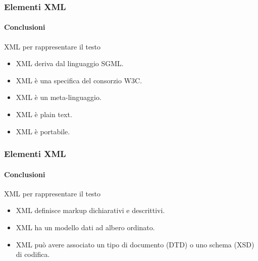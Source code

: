\begin{frame}
    \frametitle{Elementi XML}
    \framesubtitle{Conclusioni}
    \addtocounter{nframe}{1}

    \begin{block}{XML per rappresentare il testo}
        \begin{itemize}
            \item XML deriva dal linguaggio SGML.
            \item XML è una specifica del consorzio W3C.
            \item XML è un meta-linguaggio.
            \item XML è plain text.
            \item XML è portabile.
        \end{itemize}

    \end{block}

\end{frame}

\begin{frame}
    \frametitle{Elementi XML}
    \framesubtitle{Conclusioni}
    \addtocounter{nframe}{1}

    \begin{block}{XML per rappresentare il testo}
        \begin{itemize}
            \item XML definisce markup dichiarativi e descrittivi.
            \item XML ha un modello dati ad albero ordinato.
            \item XML può avere associato un tipo di documento (DTD) o uno schema (XSD) di codifica.
        \end{itemize}

    \end{block}

\end{frame}



